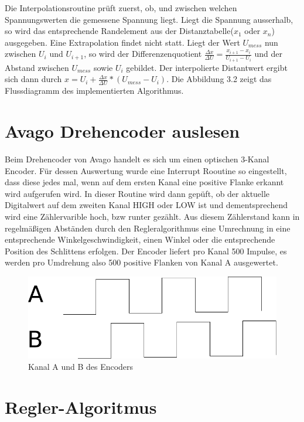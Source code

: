 \documentclass[a4paper]{report}
\begin{document}
 Die Interpolationsroutine pr\"uft zuerst, ob, und zwischen welchen Spannungswerten die gemessene Spannung liegt. Liegt die Spannung ausserhalb, so wird das entsprechende Randelement aus der Distanztabelle($x_1$ oder $x_n$) ausgegeben. Eine Extrapolation findet nicht statt. Liegt der Wert $U_{mess}$ nun zwischen $U_i$ und $U_{i+1}$, so wird der Differenzenquotient $\frac{\Delta x}{\Delta U}=\frac{x_{i+1}-x_i}{U_{i+1}-U_i}$  und der Abstand zwischen $U_{mess}$ sowie $U_i$ gebildet. Der interpolierte Distantwert ergibt sich dann durch $x=U_i+\frac{\Delta x}{\Delta U}*(U_{mess}-U_i)$. Die Abbildung 3.2 zeigt das Flussdiagramm des implementierten Algorithmus.

\chapter{Avago Drehencoder auslesen}
Beim Drehencoder von Avago handelt es sich um einen optischen 3-Kanal Encoder. F\"ur dessen Auswertung wurde eine Interrupt Rooutine so eingestellt, dass diese jedes mal, wenn auf dem ersten Kanal eine positive Flanke erkannt wird aufgerufen wird. In dieser Routine wird dann gep\"uft, ob der aktuelle Digitalwert auf dem zweiten Kanal HIGH oder LOW ist und dementsprechend wird eine Z\"ahlervarible hoch, bzw runter gez\"ahlt. Aus diesem Z\"ahlerstand kann in regelm\"a{\ss}igen Abst\"anden durch den Regleralgorithmus eine Umrechnung in eine entsprechende Winkelgeschwindigkeit, einen Winkel oder die entsprechende Position des Schlittens erfolgen. Der Encoder liefert pro Kanal 500 Impulse, es werden pro Umdrehung also 500 positive Flanken von Kanal A ausgewertet.
\begin{figure}[H]
\includegraphics[width=\textwidth]{img/encoder_channels.pdf}
\caption{Kanal A und B des Encoders}
\end{figure}

\chapter{Regler-Algoritmus}
\end{document}
